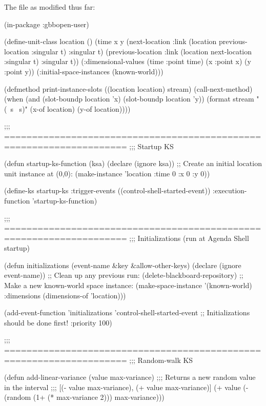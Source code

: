 \documentclass[10pt,twoside,english,pdftex]{article}
\begin{document}
\begin{tightitemize}
\item The  file as modified thus far:
%
\W\supp\notpretop
\begin{example}
  (in-package :gbbopen-user)

  (define-unit-class location ()
    (time 
     x y
     (next-location
      :link (location previous-location :singular t) 
      :singular t)
     (previous-location
      :link (location next-location :singular t)  
      :singular t))
    (:dimensional-values
      (time :point time)
      (x :point x)
      (y :point y))
    (:initial-space-instances (known-world)))

  (defmethod print-instance-slots ((location location) stream)
    (call-next-method)
    (when (and (slot-boundp location 'x)
               (slot-boundp location 'y))
      (format stream " (~s ~s)"
              (x-of location)
              (y-of location))))

  ;;; ====================================================================
  ;;;   Startup KS

  (defun startup-ks-function (ksa)
    (declare (ignore ksa))
    ;; Create an initial location unit instance at (0,0):
    (make-instance 'location :time 0 :x 0 :y 0))

  (define-ks startup-ks
      :trigger-events ((control-shell-started-event))
      :execution-function 'startup-ks-function)

  ;;; ====================================================================
  ;;;   Initializations (run at Agenda Shell startup)

  (defun initializations (event-name &key &allow-other-keys)
    (declare (ignore event-name))
    ;; Clean up any previous run:
    (delete-blackboard-repository)
    ;; Make a new known-world space instance:
    (make-space-instance 
     '(known-world)
     :dimensions (dimensions-of 'location)))

  (add-event-function 'initializations 'control-shell-started-event
                      ;; Initializations should be done first!
                      :priority 100)

  ;;; ====================================================================
  ;;;   Random-walk KS

  (defun add-linear-variance (value max-variance)
    ;;; Returns a new random value in the interval
    ;;; [(- value max-variance), (+ value max-variance)]
    (+ value (- (random (1+ (* max-variance 2))) max-variance)))


\end{example}
\end{tightitemize}
\end{document}
